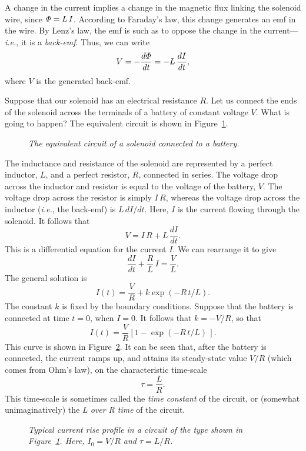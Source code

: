 A change in the current implies a change in the magnetic flux linking the solenoid
wire, since ${\mit\Phi} = L \,I$. According to Faraday's
law, this change
generates an emf in the wire. By Lenz's law, the emf is such
as to oppose the change in the current---{\em i.e.}, it is a {\em back-emf}. Thus, we can write
\begin{equation}
V = - \frac{d {\mit\Phi}}{d t} = - L\, \frac{d I}{dt},
\end{equation}
where $V$ is the generated back-emf. 


Suppose that our solenoid has an electrical resistance $R$. Let us
connect the ends of the solenoid across the terminals of a battery of
constant voltage $V$. What is going to happen? The equivalent circuit is shown in Figure~\ref{f45}.
\begin{figure}
\epsfysize=2.5in
\centerline{}
\caption{\em The equivalent circuit of a solenoid connected to a battery.}\label{f45}
\end{figure}
The inductance and resistance of the solenoid are represented by a perfect
inductor, $L$, and a perfect resistor, $R$, connected in series. The voltage drop
across the inductor and resistor is equal to the voltage of the battery,
$V$. The voltage drop across the resistor is simply $I\,R$, whereas the
voltage drop across the inductor ({\em i.e.},  the back-emf) is
$L \,dI/dt$. Here, $I$ is the current flowing through the solenoid. 
It follows that 
\begin{equation}
V = I\,R + L \,\frac{dI}{dt}.
\end{equation}
This is a differential equation for the current $I$. We can rearrange it to
give
\begin{equation}
\frac{dI}{dt}+ \frac{R}{L}\,I= \frac{V}{L}.
\end{equation}
The general solution is
\begin{equation}
I(t) = \frac{V}{R} + k \exp(-R\,t/L).
\end{equation}
The constant $k$ is fixed by the boundary conditions. Suppose that the
battery is connected at time $t=0$, when $I=0$. It follows that $k=-V/R$, so
that
\begin{equation}
I(t) = \frac{V}{R} \left[1-\exp(-R\,t/L)\,\right].
\end{equation}
This curve is shown in Figure~\ref{flr}. It can be seen that, after the battery is connected, the current
ramps up, and attains its steady-state value $V/R$ (which comes from Ohm's
law), on the characteristic time-scale
\begin{equation}
\tau = \frac{L}{R}.
\end{equation}
This time-scale is sometimes called the  {\em time constant}\/ of the circuit, or
(somewhat unimaginatively) the  {\em L over R time}\/ of the circuit. 
\begin{figure}
\epsfysize=2.5in
\centerline{}
\caption{\em Typical current rise profile in a circuit of the type shown in Figure~\ref{f45}. Here, $I_0 = V/R$ and $\tau=L/R$.}\label{flr}
\end{figure}

